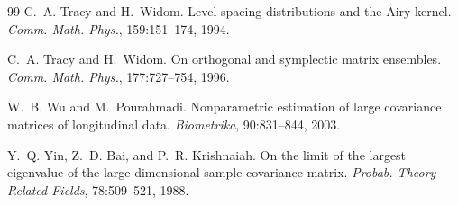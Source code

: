 \documentclass[11pt]{article}
\begin{document}
\begin{thebibliography}{99}
C.~A. Tracy and H.~Widom.
\newblock Level-spacing distributions and the {A}iry kernel.
\newblock \emph{Comm. Math. Phys.}, 159:151--174, 1994.

C.~A. Tracy and H.~Widom.
\newblock On orthogonal and symplectic matrix ensembles.
\newblock \emph{Comm. Math. Phys.}, 177:727--754, 1996.

W.~B. Wu and M.~Pourahmadi.
\newblock Nonparametric estimation of large covariance matrices of longitudinal data.
\newblock \emph{Biometrika}, 90:831--844, 2003.

Y.~Q. Yin, Z.~D. Bai, and P.~R. Krishnaiah.
\newblock On the limit of the largest eigenvalue of the large dimensional sample covariance matrix.
\newblock \emph{Probab. Theory Related Fields}, 78:509--521, 1988.

\end{thebibliography}
\end{document}

